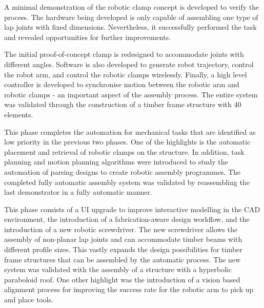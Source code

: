\newcommand{\explorationbullet}{\raisebox{.10ex}{\large$\bullet$}}

\begin{description}[style=standard] %

    \item [Exploration Round 1 - Clamp Prototype] A minimal demonstration of the robotic clamp concept is developed to verify the process. The hardware being developed is only capable of assembling one type of lap joints with fixed dimensions. Nevertheless, it successfully performed the task and revealed opportunities for further improvements. 
    
    \item [Exploration Round 2 - Bus Stop Demonstrator] The initial proof-of-concept clamp is redesigned to accommodate joints with different angles. Software is also developed to generate robot trajectory, control the robot arm, and control the robotic clamps wirelessly. Finally, a high level controller is developed to synchronise motion between the robotic arm and robotic clamps - an important aspect of the assembly process. The entire system was validated through the construction of a timber frame structure with 40 elements. 
    
    \item [Exploration Round 3 - Automatic Clamp Placement] This phase completes the automation for mechanical tasks that are identified as low priority in the previous two phases. One of the highlights is the automatic placement and retrieval of robotic clamps on the structure. In addition, task planning and motion planning algorithms were introduced to study the automation of parsing designs to create robotic assembly programmes. The completed fully automatic assembly system was validated by reassembling the last demonstrator in a fully automatic manner.  
 
    \item [Exploration Round 4 - HyparHut Demonstrator] This phase consists of a UI upgrade to improve interactive modelling in the CAD environment, the introduction of a fabrication-aware design workflow, and the introduction of a new robotic screwdriver. The new screwdriver allows the assembly of non-planar lap joints and can accommodate timber beams with different profile sizes. This vastly expands the design possibilities for timber frame structures that can be assembled by the automatic process. The new system was validated with the assembly of a structure with a hyperbolic paraboloid roof. One other highlight was the introduction of a vision based alignment process for improving the success rate for the robotic arm to pick up and place tools. 
    

\end{description}
